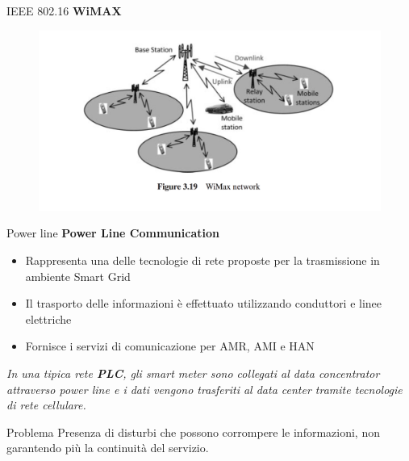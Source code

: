 \begin{frame}{IEEE 802.16}
	\textbf{WiMAX}
	\begin{figure}[h]
		\includegraphics[scale=0.3,cfbox=blue_slides 1pt 0pt]{imgs/wim.png}
	\end{figure}
\end{frame}

\begin{frame}{Power line}
	\textbf{Power Line Communication}
	\begin{itemize}[<+- | alert@+>]
		\item Rappresenta una delle tecnologie di rete proposte per la trasmissione in ambiente Smart Grid
		\item Il trasporto delle informazioni è effettuato utilizzando conduttori e linee elettriche %
		\item Fornisce i servizi di comunicazione per AMR, AMI e HAN
	\end{itemize}
	\pause
	\begin{block}{}
		\textit{In una tipica rete \textbf{\color{blue_slides}PLC}, gli smart meter sono collegati al data concentrator attraverso power line e i dati vengono trasferiti al data center tramite tecnologie di rete cellulare.}
	\end{block}
	\pause
	\begin{block}{Problema}
		Presenza di disturbi che possono corrompere le informazioni, non garantendo più la continuità del servizio.
	\end{block}
\end{frame}


